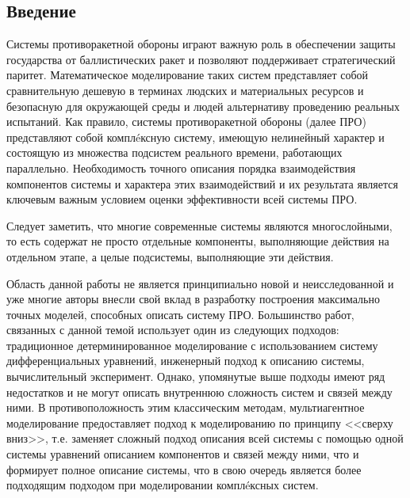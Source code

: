 \newpage
\parindent=1cm %
\begin{center}
	\section*{Введение} %
	\pagestyle{plain} %
	\setcounter{page}{3} %
\end{center}


Системы противоракетной обороны играют важную роль в обеспечении защиты государства от баллистических ракет и позволяют поддерживает стратегический паритет. Математическое моделирование таких систем представляет собой сравнительную дешевую в терминах людских и материальных ресурсов и безопасную для окружающей среды и людей альтернативу проведению реальных испытаний. Как правило, системы противоракетной обороны (далее ПРО) представляют собой компл\'eксную систему, имеющую нелинейный характер и состоящую из множества подсистем реального времени, работающих параллельно. Необходимость точного описания порядка взаимодействия компонентов системы и характера этих взаимодействий и их результата является ключевым важным условием оценки эффективности всей системы ПРО.

Следует заметить, что многие современные системы являются многослойными, то есть содержат не просто отдельные компоненты, выполняющие действия на отдельном этапе, а целые подсистемы, выполняющие эти действия.

Область данной работы не является принципиально новой и неисследованной и уже многие авторы внесли свой вклад в разработку построения максимально точных моделей, способных описать систему ПРО. Большинство работ, связанных с данной темой использует один из следующих подходов: традиционное детерминированное моделирование с использованием систему дифференциальных уравнений, инженерный подход к описанию системы, вычислительный эксперимент. Однако, упомянутые выше подходы имеют ряд недостатков и не могут описать внутреннюю сложность систем и связей между ними. В противоположность этим классическим методам, мультиагентное моделирование предоставляет подход к моделированию по принципу <<сверху вниз>>, т.е. заменяет сложный подход описания всей системы с помощью одной системы уравнений описанием компонентов и связей между ними, что и формирует полное описание системы, что в свою очередь является более подходящим подходом при моделировании компл\'eксных систем.

